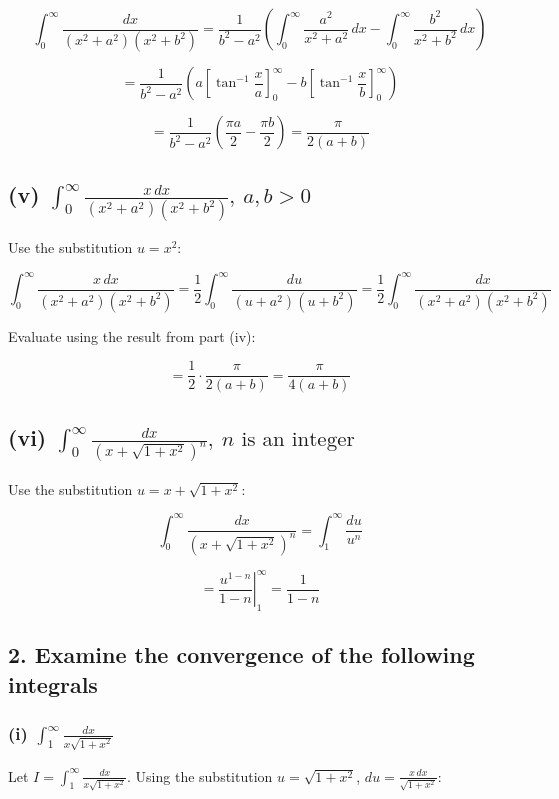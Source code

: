 \documentclass{article}
\begin{document}
\[
\int_0^\infty \frac{dx}{(x^2 + a^2)(x^2 + b^2)} = \frac{1}{b^2 - a^2} \left( \int_0^\infty \frac{a^2}{x^2 + a^2} \, dx - \int_0^\infty \frac{b^2}{x^2 + b^2} \, dx \right)
\]




\[
= \frac{1}{b^2 - a^2} \left( a \left[ \tan^{-1} \frac{x}{a} \right]_0^\infty - b \left[ \tan^{-1} \frac{x}{b} \right]_0^\infty \right)
\]




\[
= \frac{1}{b^2 - a^2} \left( \frac{\pi a}{2} - \frac{\pi b}{2} \right) = \frac{\pi}{2(a + b)}
\]



\subsection*{(v) \(\int_0^\infty \frac{x \, dx}{(x^2 + a^2)(x^2 + b^2)}, \ a, b > 0 \)}
Use the substitution \( u = x^2 \):


\[
\int_0^\infty \frac{x \, dx}{(x^2 + a^2)(x^2 + b^2)} = \frac{1}{2} \int_0^\infty \frac{du}{(u + a^2)(u + b^2)} = \frac{1}{2} \int_0^\infty \frac{dx}{(x^2 + a^2)(x^2 + b^2)}
\]


Evaluate using the result from part (iv):


\[
= \frac{1}{2} \cdot \frac{\pi}{2(a + b)} = \frac{\pi}{4(a + b)}
\]



\subsection*{(vi) \(\int_0^\infty \frac{dx}{(x + \sqrt{1 + x^2})^n}, \ n \text{ is an integer} \)}
Use the substitution \( u = x + \sqrt{1 + x^2} \):


\[
\int_0^\infty \frac{dx}{(x + \sqrt{1 + x^2})^n} = \int_1^\infty \frac{du}{u^n}
\]




\[
= \left. \frac{u^{1-n}}{1-n} \right|_1^\infty = \frac{1}{1-n}
\]

\subsection*{2. Examine the convergence of the following integrals}

\subsubsection*{(i) \(\int_1^\infty \frac{dx}{x\sqrt{1 + x^2}}\)}
Let \( I = \int_1^\infty \frac{dx}{x\sqrt{1 + x^2}} \).
Using the substitution \( u = \sqrt{1 + x^2} \), \( du = \frac{x \, dx}{\sqrt{1 + x^2}} \):
\end{document}
